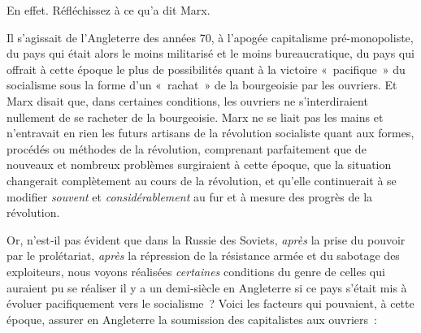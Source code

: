 \documentclass[french,twoside]{book} %
\begin{document}
En effet. Réfléchissez à ce qu’a dit Marx.\par
\bigbreak
\noindent Il s’agissait de l’Angleterre des années 70, à l’apogée capitalisme pré-monopoliste, du pays qui était alors le moins militarisé et le moins bureaucratique, du pays qui offrait à cette époque le plus de possibilités quant à la victoire « pacifique » du socialisme sous la forme d’un « rachat » de la bourgeoisie par les ouvriers. Et Marx disait que, dans certaines conditions, les ouvriers ne s’interdiraient nullement de se racheter de la bourgeoisie. Marx ne se liait pas les mains et n’entravait en rien les futurs artisans de la révolution socialiste quant aux formes, procédés ou méthodes de la révolution, comprenant parfaitement que de nouveaux et nombreux problèmes surgiraient à cette époque, que la situation changerait complètement au cours de la révolution, et qu’elle continuerait à se modifier \emph{souvent} et \emph{considérablement} au fur et à mesure des progrès de la révolution.\par
Or, n’est‑il pas évident que dans la Russie des Soviets, \emph{après} la prise du pouvoir par le prolétariat, \emph{après} la répression de la résistance armée et du sabotage des exploiteurs, nous voyons réalisées \emph{certaines} conditions du genre de celles qui auraient pu se réaliser il y a un demi‑siècle en Angleterre si ce pays s’était mis à évoluer pacifiquement vers le socialisme ? Voici les facteurs qui pouvaient, à cette époque, assurer en Angleterre la soumission des capitalistes aux ouvriers :\par
\end{document}
